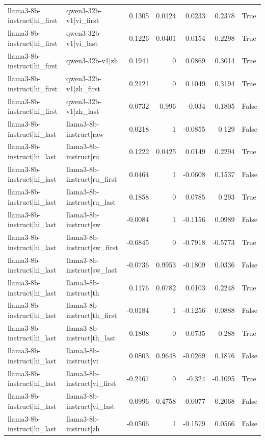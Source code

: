 \begin{table}
\begin{tabular}{l l r r r r l}
llama3-8b-instruct|hi_first & qwen3-32b-v1|vi_first & 0.1305 & 0.0124 & 0.0233 & 0.2378 & True \\
llama3-8b-instruct|hi_first & qwen3-32b-v1|vi_last & 0.1226 & 0.0401 & 0.0154 & 0.2298 & True \\
llama3-8b-instruct|hi_first & qwen3-32b-v1|zh & 0.1941 & 0 & 0.0869 & 0.3014 & True \\
llama3-8b-instruct|hi_first & qwen3-32b-v1|zh_first & 0.2121 & 0 & 0.1049 & 0.3194 & True \\
llama3-8b-instruct|hi_first & qwen3-32b-v1|zh_last & 0.0732 & 0.996 & -0.034 & 0.1805 & False \\
llama3-8b-instruct|hi_last & llama3-8b-instruct|raw & 0.0218 & 1 & -0.0855 & 0.129 & False \\
llama3-8b-instruct|hi_last & llama3-8b-instruct|ru & 0.1222 & 0.0425 & 0.0149 & 0.2294 & True \\
llama3-8b-instruct|hi_last & llama3-8b-instruct|ru_first & 0.0464 & 1 & -0.0608 & 0.1537 & False \\
llama3-8b-instruct|hi_last & llama3-8b-instruct|ru_last & 0.1858 & 0 & 0.0785 & 0.293 & True \\
llama3-8b-instruct|hi_last & llama3-8b-instruct|sw & -0.0084 & 1 & -0.1156 & 0.0989 & False \\
llama3-8b-instruct|hi_last & llama3-8b-instruct|sw_first & -0.6845 & 0 & -0.7918 & -0.5773 & True \\
llama3-8b-instruct|hi_last & llama3-8b-instruct|sw_last & -0.0736 & 0.9953 & -0.1809 & 0.0336 & False \\
llama3-8b-instruct|hi_last & llama3-8b-instruct|th & 0.1176 & 0.0782 & 0.0103 & 0.2248 & True \\
llama3-8b-instruct|hi_last & llama3-8b-instruct|th_first & -0.0184 & 1 & -0.1256 & 0.0888 & False \\
llama3-8b-instruct|hi_last & llama3-8b-instruct|th_last & 0.1808 & 0 & 0.0735 & 0.288 & True \\
llama3-8b-instruct|hi_last & llama3-8b-instruct|vi & 0.0803 & 0.9648 & -0.0269 & 0.1876 & False \\
llama3-8b-instruct|hi_last & llama3-8b-instruct|vi_first & -0.2167 & 0 & -0.324 & -0.1095 & True \\
llama3-8b-instruct|hi_last & llama3-8b-instruct|vi_last & 0.0996 & 0.4758 & -0.0077 & 0.2068 & False \\
llama3-8b-instruct|hi_last & llama3-8b-instruct|zh & -0.0506 & 1 & -0.1579 & 0.0566 & False \\

\end{tabular}
\end{table}
